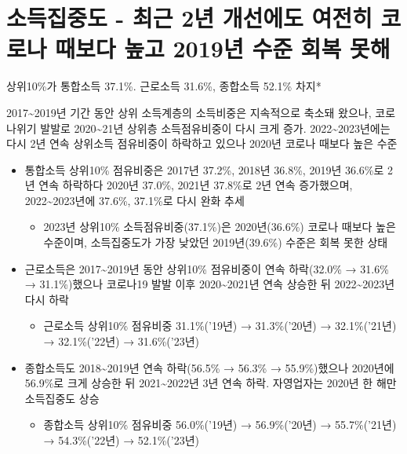 \documentclass[
  a4paper,
  oneside,
  open=any]{scrbook}
\providecommand{\tightlist}{%
  \setlength{\itemsep}{0pt}\setlength{\parskip}{0pt}}\usepackage{longtable,booktabs,array}
\begin{document}
\section{소득집중도 - 최근 2년 개선에도 여전히 코로나 때보다 높고 2019년
수준 회복
못해}\label{uxc18cuxb4dduxc9d1uxc911uxb3c4---uxcd5cuxadfc-2uxb144-uxac1cuxc120uxc5d0uxb3c4-uxc5ecuxc804uxd788-uxcf54uxb85cuxb098-uxb54cuxbcf4uxb2e4-uxb192uxace0-2019uxb144-uxc218uxc900-uxd68cuxbcf5-uxbabbuxd574}

상위10\%가 통합소득 37.1\%. 근로소득 31.6\%, 종합소득 52.1\% 차지*

2017\textasciitilde2019년 기간 동안 상위 소득계층의 소득비중은
지속적으로 축소돼 왔으나, 코로나위기 발발로 2020\textasciitilde21년
상위층 소득점유비중이 다시 크게 증가. 2022\textasciitilde2023년에는 다시
2년 연속 상위소득 점유비중이 하락하고 있으나 2020년 코로나 때보다 높은
수준

\begin{itemize}
\item
  통합소득 상위10\% 점유비중은 2017년 37.2\%, 2018년 36.8\%, 2019년
  36.6\%로 2년 연속 하락하다 2020년 37.0\%, 2021년 37.8\%로 2년 연속
  증가했으며, 2022\textasciitilde2023년에 37.6\%, 37.1\%로 다시 완화
  추세

  \begin{itemize}
  \tightlist
  \item
    2023년 상위10\% 소득점유비중(37.1\%)은 2020년(36.6\%) 코로나 때보다
    높은 수준이며, 소득집중도가 가장 낮았던 2019년(39.6\%) 수준은 회복
    못한 상태
  \end{itemize}
\item
  근로소득은 2017\textasciitilde2019년 동안 상위10\% 점유비중이 연속
  하락(32.0\% → 31.6\% → 31.1\%)했으나 코로나19 발발 이후
  2020\textasciitilde2021년 연속 상승한 뒤 2022\textasciitilde2023년
  다시 하락

  \begin{itemize}
  \tightlist
  \item
    근로소득 상위10\% 점유비중 31.1\%('19년) → 31.3\%('20년) →
    32.1\%('21년) → 32.1\%('22년) → 31.6\%('23년)
  \end{itemize}
\item
  종합소득도 2018\textasciitilde2019년 연속 하락(56.5\% → 56.3\% →
  55.9\%)했으나 2020년에 56.9\%로 크게 상승한 뒤
  2021\textasciitilde2022년 3년 연속 하락. 자영업자는 2020년 한 해만
  소득집중도 상승

  \begin{itemize}
  \tightlist
  \item
    종합소득 상위10\% 점유비중 56.0\%('19년) → 56.9\%('20년) →
    55.7\%('21년) → 54.3\%('22년) → 52.1\%('23년)
  \end{itemize}
\end{itemize}
\end{document}
